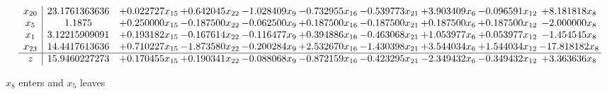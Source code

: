 \documentclass[10pt]{article}
\begin{document}
\[\begin{array}{c| c c@{\hskip 2pt} c@{\hskip 2pt} c@{\hskip 2pt} c@{\hskip 2pt} c@{\hskip 2pt} c@{\hskip 2pt} c@{\hskip 2pt} c@{\hskip 2pt} }
 x_{20}   &  23.1761363636 & + 0.022727 x_{15} & + 0.642045 x_{22} & -1.028409 x_{9} & -0.732955 x_{16} & -0.539773 x_{21} & + 3.903409 x_{6} & -0.096591 x_{12} & + 8.181818 x_{8}\\
 x_{5}   &  1.1875 & + 0.250000 x_{15} & -0.187500 x_{22} & -0.062500 x_{9} & + 0.187500 x_{16} & -0.187500 x_{21} & + 0.187500 x_{6} & + 0.187500 x_{12} & -2.000000 x_{8}\\
 x_{1}   &  3.12215909091 & + 0.193182 x_{15} & -0.167614 x_{22} & -0.116477 x_{9} & + 0.394886 x_{16} & -0.463068 x_{21} & + 1.053977 x_{6} & + 0.053977 x_{12} & -1.454545 x_{8}\\
 x_{23}   &  14.4417613636 & + 0.710227 x_{15} & -1.873580 x_{22} & -0.200284 x_{9} & + 2.532670 x_{16} & -1.430398 x_{21} & + 3.544034 x_{6} & + 1.544034 x_{12} & -17.818182 x_{8}\\
\hline
z    &  15.9460227273 & + 0.170455 x_{15} & + 0.190341 x_{22} & -0.088068 x_{9} & -0.872159 x_{16} & -0.423295 x_{21} & -2.349432 x_{6} & -0.349432 x_{12} & + 3.363636 x_{8}\\
\end{array}\]


 $ x_{8} $ enters and $ x_{5} $ leaves 
\end{document}
